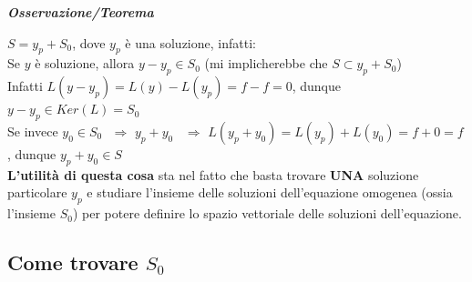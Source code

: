 \documentclass{article}
\theoremstyle{definition}
\begin{document}
    \begin{center}
        \textbf{\textit{Osservazione/Teorema}}
    \end{center}
$S=y_p+S_0$, dove $y_p$ è una soluzione, infatti:
\\
Se $y$ è soluzione, allora $y-y_p \in S_0$ (mi implicherebbe che $S \subset y_p+ S_0$)
\\
Infatti $L(y-y_p)=L(y)-L(y_p)=f-f=0$, dunque $y-y_p \in Ker(L) = S_0$
\\
Se invece $y_0 \in S_0 \,\,\,\, \Longrightarrow \,\, y_p + y_0 \,\,\,\,\,\Longrightarrow \,\, L(y_p+y_0)=L(y_p)+L(y_0)=f+0=f$, dunque $y_p+y_0 \in S$
\\
\textbf{L'utilità di questa cosa} sta nel fatto che basta trovare \textbf{UNA} soluzione particolare $y_p$ e studiare l'insieme delle soluzioni dell'equazione omogenea (ossia l'insieme $S_0$) per potere definire lo spazio vettoriale delle soluzioni dell'equazione.
\subsection{Come trovare $S_0$}
\end{document}
